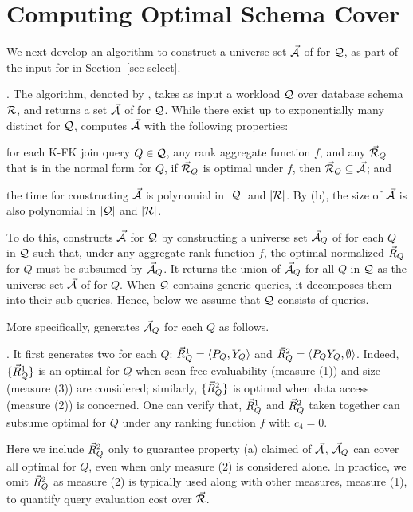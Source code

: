 {\section{Computing Optimal Schema Cover}
\label{sec-cover}

We next develop an algorithm to construct a universe set
$\vec{{\mathcal A}}$ of \bss for $\mathcal Q$, as part of the input for \opts in
Section~\ref{sec-select}.

. The algorithm, denoted by \usc, takes as input a workload $\mathcal Q$
over database schema ${\mathcal R}$, and returns a set $\vec{{\mathcal A}}$ of \bss
for $\mathcal Q$.
While there exist up to exponentially many distinct \bss for
$\mathcal Q$, \usc computes $\vec{{\mathcal A}}$ with the following properties:
\bi
\item[(a)] for each K-FK join \SPC query $Q\in \mathcal Q$, any rank aggregate function $f$,
  and any \bds $\vec{{\mathcal R}}_{Q}$ that is in the normal form for $Q$,
  if $\vec{{\mathcal R}}_{Q}$ is optimal under $f$, then
  $\vec{{\mathcal R}}_{Q}\subseteq \vec{{\mathcal A}}$; and
\item[(b)] the time for constructing $\vec{{\mathcal A}}$ is polynomial in
  $|\mathcal Q|$ and $|{\mathcal R}|$.
\ei
By (b), the size of $\vec{{\mathcal A}}$ is also polynomial in
$|\mathcal Q|$ and $|{\mathcal R}|$.

To do this, \usc constructs $\vec{{\mathcal A}}$ for $\mathcal Q$ by
constructing a universe set $\vec{{\mathcal A}}_{Q}$ of \bss for each $Q$ in $\mathcal Q$
such that, under any aggregate rank function $f$, the optimal
normalized \bds $\vec{R}_{Q}$ for $Q$ must be subsumed by $\vec{{\mathcal A}}_{Q}$.
It returns the union of $\vec{{\mathcal A}}_{Q}$ for all $Q$ in $\mathcal Q$ as
the universe set $\vec{{\mathcal A}}$ of \bss for $Q$. When $\mathcal Q$ contains
generic \SQL queries, it decomposes them into their \SPC
sub-queries. Hence, below we assume that $\mathcal Q$ consists of \SPC queries.

More specifically, \usc generates $\vec{{\mathcal A}}_{Q}$ for each $Q$ as follows.

. It first generates two \bss for each $Q$:
$\vec{R}_{Q}^{1} = \langle P_{Q},\allowbreak Y_{Q}\rangle$ and $\vec{R}_{Q}^{2} =
\langle P_{Q}Y_{Q},\allowbreak \emptyset\rangle$. Indeed, $\{\vec{R}_{Q}^{1}\}$ is
an optimal \bds for $Q$ when scan-free evaluability (measure (1))
and size (measure (3)) are considered; similarly,
$\{\vec{R}_{Q}^{2}\}$ is optimal when data access (measure (2)) is
concerned.
One can verify that, $\vec{R}_{Q}^{1}$ and $\vec{R}_{Q}^{2}$ taken
together can subsume optimal \bdss for $Q$ under any ranking
function $f$ with $c_{4} = 0$.

Here we include $\vec{R}_{Q}^{2}$ only to guarantee property (a)
claimed of $\vec{{\mathcal A}}$, \ie $\vec{{\mathcal A}}_{Q}$ can cover all optimal
\bdss for $Q$, even when only measure (2) is considered alone. In
practice, we omit $\vec{R}_{Q}^{2}$ as measure (2) is typically
used along with other measures, \eg measure (1), to quantify
query evaluation cost over $\vec{{\mathcal R}}$.




}
